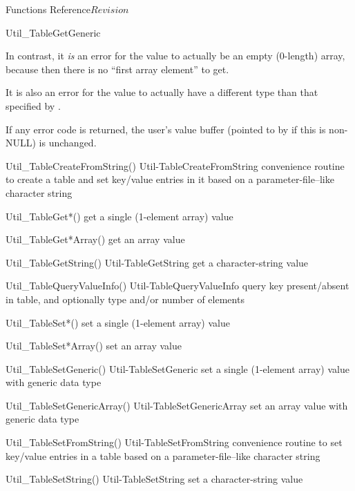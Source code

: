 \begin{cactuspart}{ Functions Reference}{}{$Revision$}
\begin{FunctionDescription}{Util\_TableGetGeneric}
\begin{Discussion}
In contrast, it {\em is\/} an error for the value to actually be an
empty (0-length) array, because then there is no ``first array element''
to get.

It is also an error for the value to actually have a different type
than that specified by .

If any error code is returned, the user's value buffer
(pointed to by  if this is non-NULL) is unchanged.
\end{Discussion}

\begin{SeeAlsoSection}
\begin{SeeAlso2} {Util\_TableCreateFromString()} {Util-TableCreateFromString}
convenience routine to create a table and set key/value entries
in it based on a parameter-file--like character string
\end{SeeAlso2}
\begin{SeeAlso}{Util\_TableGet*()}
get a single (1-element array) value
\end{SeeAlso}
\begin{SeeAlso}{Util\_TableGet*Array()}
get an array value
\end{SeeAlso}
\begin{SeeAlso2} {Util\_TableGetString()} {Util-TableGetString}
get a character-string value
\end{SeeAlso2}
\begin{SeeAlso2} {Util\_TableQueryValueInfo()} {Util-TableQueryValueInfo}
query key present/absent in table, and optionally type and/or number
of elements
\end{SeeAlso2}
\begin{SeeAlso}{Util\_TableSet*()}
set a single (1-element array) value
\end{SeeAlso}
\begin{SeeAlso}{Util\_TableSet*Array()}
set an array value
\end{SeeAlso}
\begin{SeeAlso2} {Util\_TableSetGeneric()} {Util-TableSetGeneric}
set a single (1-element array) value with generic data type
\end{SeeAlso2}
\begin{SeeAlso2} {Util\_TableSetGenericArray()} {Util-TableSetGenericArray}
set an array value with generic data type
\end{SeeAlso2}
\begin{SeeAlso2} {Util\_TableSetFromString()} {Util-TableSetFromString}
convenience routine to set key/value entries in a table based on a
parameter-file--like character string
\end{SeeAlso2}
\begin{SeeAlso2} {Util\_TableSetString()} {Util-TableSetString}
set a character-string value
\end{SeeAlso2}
\end{SeeAlsoSection}


\end{FunctionDescription}
\end{cactuspart}
